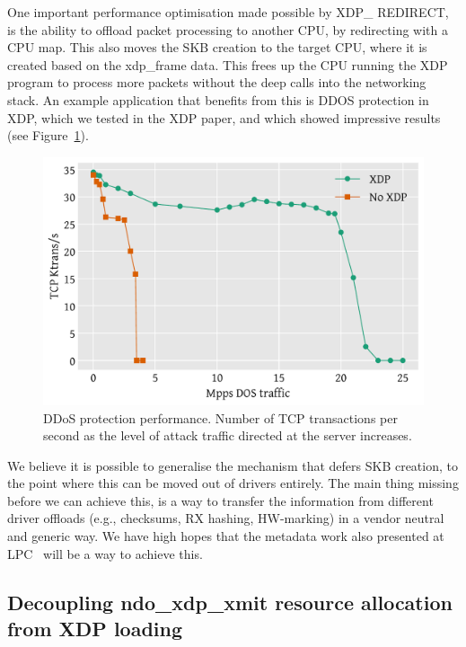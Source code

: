 \documentclass[sigconf]{acmart}
\begin{document}
One important performance optimisation made possible by XDP\_ REDIRECT, is the
ability to offload packet processing to another CPU, by redirecting with a CPU
map. This also moves the SKB creation to the target CPU, where it is created
based on the xdp\_frame data. This frees up the CPU running the XDP program to
process more packets without the deep calls into the networking stack. An
example application that benefits from this is DDOS protection in XDP, which we
tested in the XDP paper, and which showed impressive results (see
Figure~\ref{fig:ddos-results}).

\begin{figure}[t]
\centering
\includegraphics[width=\linewidth]{images/ddos-test.pdf}
\caption{\label{fig:ddos-results} DDoS protection performance. Number of TCP
  transactions per second as the level of attack traffic directed at the server
  increases.}
\end{figure}

We believe it is possible to generalise the mechanism that defers SKB creation,
to the point where this can be moved out of drivers entirely. The main thing
missing before we can achieve this, is a way to transfer the information from
different driver offloads (e.g., checksums, RX hashing, HW-marking) in a vendor
neutral and generic way. We have high hopes that the metadata work also
presented at LPC~\cite{xdp-metadata} will be a way to achieve this.


\subsection{Decoupling ndo\_xdp\_xmit resource allocation from XDP loading}
\label{sec:decoupling-ndo-xdp-xmit}
\end{document}

